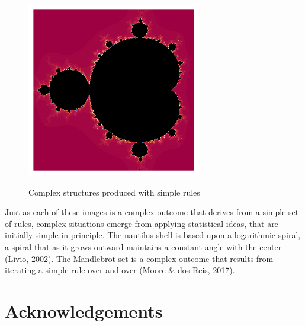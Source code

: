 \documentclass[
  letterpaper,
  DIV=11,
  numbers=noendperiod]{scrreprt}
\begin{document}
\begin{tcolorbox}
\begin{figure}[H]
\begin{minipage}{0.50\linewidth}
\end{minipage}%
%
\begin{minipage}{0.50\linewidth}

\includegraphics[width=\textwidth,height=3in]{mandelbrot.png}

\end{minipage}%
\newline
\begin{minipage}{0.50\linewidth}
Complex structures produced with simple rules\end{minipage}%

\end{figure}%

Just as each of these images is a complex outcome that derives from a
simple set of rules, complex situations emerge from applying statistical
ideas, that are initially simple in principle. The nautilus shell is
based upon a logarithmic spiral, a spiral that as it grows outward
maintains a constant angle with the center (Livio, 2002). The Mandlebrot
set is a complex outcome that results from iterating a simple rule over
and over (Moore \& dos Reis, 2017).

\end{tcolorbox}


\chapter*{Acknowledgements}\label{acknowledgements}

\end{document}
